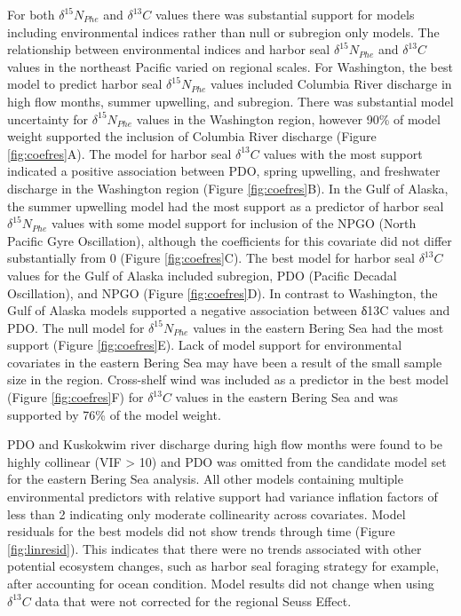 \documentclass [11pt, proquest] {uwthesis}[2015/03/03]
\begin{document}
For both \(\delta^{15}N_{Phe}\) and \(\delta^{13}C\) values there was substantial support for models including environmental indices rather than null or subregion only models. The relationship between environmental indices and harbor seal \(\delta^{15}N_{Phe}\) and \(\delta^{13}C\) values in the northeast Pacific varied on regional scales. For Washington, the best model to predict harbor seal \(\delta^{15}N_{Phe}\) values included Columbia River discharge in high flow months, summer upwelling, and subregion. There was substantial model uncertainty for \(\delta^{15}N_{Phe}\) values in the Washington region, however 90\% of model weight supported the inclusion of Columbia River discharge (Figure \ref{fig:coefres}A). The model for harbor seal \(\delta^{13}C\) values with the most support indicated a positive association between PDO, spring upwelling, and freshwater discharge in the Washington region (Figure \ref{fig:coefres}B). In the Gulf of Alaska, the summer upwelling model had the most support as a predictor of harbor seal \(\delta^{15}N_{Phe}\) values with some model support for inclusion of the NPGO (North Pacific Gyre Oscillation), although the coefficients for this covariate did not differ substantially from 0 (Figure \ref{fig:coefres}C). The best model for harbor seal \(\delta^{13}C\) values for the Gulf of Alaska included subregion, PDO (Pacific Decadal Oscillation), and NPGO (Figure \ref{fig:coefres}D). In contrast to Washington, the Gulf of Alaska models supported a negative association between δ13C values and PDO. The null model for \(\delta^{15}N_{Phe}\) values in the eastern Bering Sea had the most support (Figure \ref{fig:coefres}E). Lack of model support for environmental covariates in the eastern Bering Sea may have been a result of the small sample size in the region. Cross-shelf wind was included as a predictor in the best model (Figure \ref{fig:coefres}F) for \(\delta^{13}C\) values in the eastern Bering Sea and was supported by 76\% of the model weight.

PDO and Kuskokwim river discharge during high flow months were found to be highly collinear (VIF \textgreater{} 10) and PDO was omitted from the candidate model set for the eastern Bering Sea analysis. All other models containing multiple environmental predictors with relative support had variance inflation factors of less than 2 indicating only moderate collinearity across covariates. Model residuals for the best models did not show trends through time (Figure \ref{fig:linresid}). This indicates that there were no trends associated with other potential ecosystem changes, such as harbor seal foraging strategy for example, after accounting for ocean condition. Model results did not change when using \(\delta^{13}C\) data that were not corrected for the regional Seuss Effect.
\end{document}
